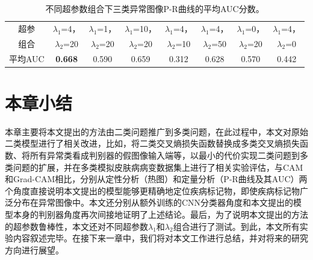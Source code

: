 \begin{table}[H]
	\centering
	\caption[不同超参数组合下三类异常图像P-R曲线的平均AUC分数]{不同超参数组合下三类异常图像P-R曲线的平均AUC分数。}
	\label{tab:simulated_skin_diff_parameters}
		\begin{tabular}{c|c|c|c|c|c|c|c}
			\toprule[2pt]
			
			超参& $\lambda_{1}$=4， & $\lambda_{1}$=1，& $\lambda_{1}$=10，&
			$\lambda_{1}$=4， & $\lambda_{1}$=4， &
			$\lambda_{1}$=0， &
			$\lambda_{1}$=4，\\
			组合		  & 
			$\lambda_{2}$=20 & $\lambda_{2}$=20 &
			$\lambda_{2}$=20 & $\lambda_{2}$=10 & $\lambda_{2}$=50 &
			$\lambda_{2}$=20&
			$\lambda_{2}$=0 \\
			\midrule[2pt]



			平均AUC	& \textbf{0.668} &	0.590 & 0.659 & 0.312 & 0.628& 0.570 &	0.442 \\
			\bottomrule[2pt]
		\end{tabular}
\end{table}
\section{本章小结}
本章主要将本文提出的方法由二类问题推广到多类问题，在此过程中，本文对原始二类模型进行了相关改进，比如，将二类交叉熵损失函数替换成多类交叉熵损失函数、将所有异常类看成判别器的假图像输入端等，以最小的代价实现二类问题到多类问题的扩展，并在多类模拟皮肤病病变数据集上进行了相关实验评估，与CAM和Grad-CAM相比，分别从定性分析（热图）和定量分析（P-R曲线及其AUC）两个角度直接说明本文提出的模型能够更精确地定位疾病标记物，即使疾病标记物广泛分布在异常图像中。本文还分别从额外训练的CNN分类器角度和本文提出的模型本身的判别器角度再次间接地证明了上述结论。最后，为了说明本文提出的方法的超参数鲁棒性，本文还对不同超参数$\lambda_{1}$和$\lambda_{2}$组合进行了测试。到此，本文所有实验内容叙述完毕。在接下来一章中，我们将对本文工作进行总结，并对将来的研究方向进行展望。

